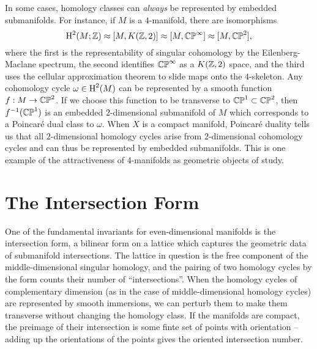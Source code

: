 \begin{remark}
	In some cases, homology classes can \emph{always} be represented by embedded submanifolds. For instance, if $M$ is a $4$-manifold, there are isomorphisms
	\begin{equation}
		\operatorname{H}^2(M; \mathbb{Z}) \approx [M, K(\mathbb{Z},2)] \approx [M, \mathbb{CP}^\infty] \approx [M,\mathbb{CP}^2],
	\end{equation}
	where the first is the representability of singular cohomology by the Eilenberg-Maclane spectrum, the second identifies $\mathbb{CP}^\infty$ as a $K(\mathbb{Z},2)$ space, and the third uses the cellular approximation theorem to slide maps onto the $4$-skeleton. Any cohomology cycle $\omega\in \operatorname{H}^2(M)$ can be represented by a smooth function $f : M \to \mathbb{CP}^2$. If we choose this function to be transverse to $\mathbb{CP}^1\subset \mathbb{CP}^2$, then $f^{-1}(\mathbb{CP}^1)$ is an embedded $2$-dimensional submanifold of $M$ which corresponds to a Poincar\'e dual class to $\omega$. When $X$ is a compact manifold, Poincar\'e duality tells us that all $2$-dimensional homology cycles arise from $2$-dimensional cohomology cycles and can thus be represented by embedded submanifolds. This is one example of the attractiveness of $4$-manifolds as geometric objects of study.
\end{remark}


\pagebreak
\section{The Intersection Form}\label{sec:intersection-form}

One of the fundamental invariants for even-dimensional manifolds is the intersection form, a bilinear form on a lattice which captures the geometric data of submanifold intersections. The lattice in question is the free component of the middle-dimensional singular homology, and the pairing of two homology cycles by the form counts their number of ``intersections''. When the homology cycles of complementary dimension (as in the case of middle-dimensional homology cycles) are represented by smooth immersions, we can perturb them to make them transverse without changing the homology class. If the manifolds are compact, the preimage of their intersection is some finte set of points with orientation -- adding up the orientations of the points gives the oriented intersection number.

